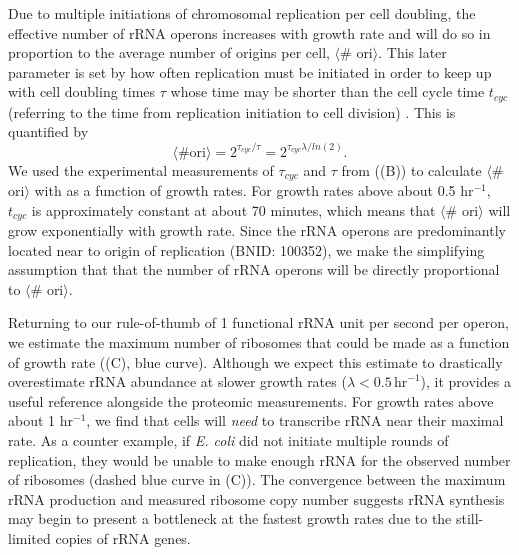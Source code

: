 Due to multiple initiations of chromosomal replication per cell doubling, the
effective number of rRNA operons increases with growth rate and will do so in
proportion to the average number of origins per cell, $\langle$\# ori$\rangle$.
This later parameter is set by how often replication must be initiated in order
to keep up with cell doubling times $\tau$ whose time may be shorter than the
cell cycle time $t_{cyc}$ (referring to the time from replication initiation to
cell division) \cite{dennis2004}. This is quantified by
\begin{equation}
    \langle \text{\# ori} \rangle = 2^{\tau_{cyc} / \tau} = 2^{\tau_{cyc} \lambda / ln(2)}.
    \label{eq:Nori}
\end{equation}
We used the experimental measurements of $\tau_{cyc}$ and $\tau$ from
\cite{si2017} ((B)) to calculate
$\langle$\# ori$\rangle$  with  as a function of growth rates. For
growth rates above about 0.5 hr$^{-1}$, $t_{cyc}$ is approximately constant at
about 70 minutes, which means that $\langle$\# ori$\rangle$ will grow
exponentially with growth rate. Since the rRNA operons are predominantly located
near to origin of replication (BNID: 100352), we make the simplifying
assumption that that the number of rRNA operons  will be directly proportional
to $\langle$\# ori$\rangle$.

Returning to our rule-of-thumb of 1 functional rRNA unit per second per operon,
we estimate the maximum number of ribosomes that could be made as a function of
growth rate ((C), blue curve). Although we expect this
estimate to drastically overestimate rRNA abundance at slower growth rates
($\lambda < 0.5\, \text{hr}^{-1}$), it provides a useful reference alongside the
proteomic measurements. For growth rates above about 1 hr$^{-1}$, we find that
cells will \textit{need} to transcribe rRNA near their maximal rate. As a counter
example, if \textit{E. coli} did not initiate multiple rounds of replication,
they would be unable to make enough rRNA for the observed number of ribosomes
(dashed blue curve in (C)). The convergence between the
maximum rRNA production and measured ribosome copy number suggests rRNA
synthesis may begin to present a bottleneck at the fastest growth rates due to
the still-limited copies of rRNA genes.



%

